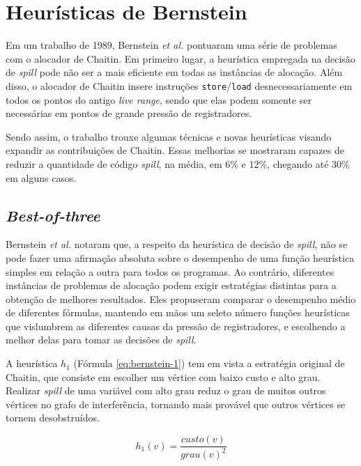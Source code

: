 \documentclass[
	12pt,				%
	openright,			%
	oneside,			%
	a4paper,			%
	tccpreliminar,			%
	]{ABNT-DC-UEL}
\begin{document}
\section{Heurísticas de Bernstein}

Em um trabalho de 1989, Bernstein \textit{et al.} \cite{bernstein:89} pontuaram uma série de problemas com o alocador de Chaitin. Em primeiro lugar, a heurística empregada na decisão de \textit{spill} pode não ser a mais eficiente em todas as instâncias de alocação. Além disso, o alocador de Chaitin insere instruções \texttt{store}/\texttt{load} desnecessariamente em todos os pontos do antigo \textit{live range}, sendo que elas podem somente ser necessárias em pontos de grande pressão de registradores. 

Sendo assim, o trabalho trouxe algumas técnicas e novas heurísticas visando expandir as contribuições de Chaitin. Essas melhorias se mostraram capazes de reduzir a quantidade de código \textit{spill}, na média, em 6\% e 12\%, chegando até 30\% em alguns casos.

\subsection{\textit{Best-of-three}}

Bernstein \textit{et al.} notaram que, a respeito da heurística de decisão de \textit{spill}, não se pode fazer uma afirmação absoluta sobre o desempenho de uma função heurística simples em relação a outra para todos os programas. Ao contrário, diferentes instâncias de problemas de alocação podem exigir estratégias distintas para a obtenção de melhores resultados. Eles propuseram comparar o desempenho médio de diferentes fórmulas, mantendo em mãos um seleto número funções heurísticas que vislumbrem as diferentes causas da pressão de registradores, e escolhendo a melhor delas para tomar as decisões de \textit{spill}.

A heurística $h_1$ (Fórmula \ref{eq:bernstein-1}) tem em vista a estratégia original de Chaitin, que consiste em escolher um vértice com baixo custo e alto grau. Realizar \textit{spill} de uma variável com alto grau reduz o grau de muitos outros vértices no grafo de interferência, tornando mais provável que outros vértices se tornem desobstruídos.

\begin{equation}
    h_1(v) = \frac{\textit{custo}(v)}{\textit{grau}(v)^2}
    \label{eq:bernstein-1}
\end{equation}
\end{document}
